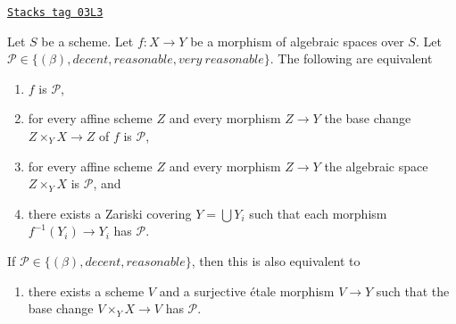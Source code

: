 \begin{lemma}
\label{decent-spaces-lemma-relative-conditions-local}
\href{https://stacks.math.columbia.edu/tag/03L3}{\texttt{Stacks tag 03L3}}

Let $S$ be a scheme.
Let $f : X \to Y$ be a morphism of algebraic spaces over $S$.
Let $\mathcal{P} \in \{(\beta), decent, reasonable, very\ reasonable\}$.
The following are equivalent
\begin{enumerate}
\item $f$ is $\mathcal{P}$,
\item for every affine scheme $Z$ and every morphism $Z \to Y$ the
base change $Z \times_Y X \to Z$ of $f$ is $\mathcal{P}$,
\item for every affine scheme $Z$ and every morphism $Z \to Y$ the
algebraic space $Z \times_Y X$ is $\mathcal{P}$, and
\item there exists a Zariski covering $Y = \bigcup Y_i$ such
that each morphism $f^{-1}(Y_i) \to Y_i$ has $\mathcal{P}$.
\end{enumerate}
If $\mathcal{P} \in \{(\beta), decent, reasonable\}$, then this is also
equivalent to
\begin{enumerate}
\item[(5)] there exists a scheme $V$ and a surjective \'etale morphism
$V \to Y$ such that the base change $V \times_Y X \to V$ has
$\mathcal{P}$.
\end{enumerate}
\end{lemma}

